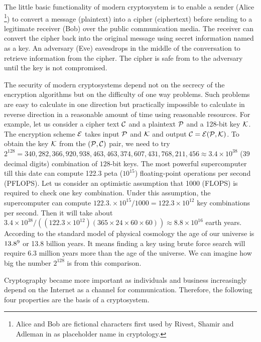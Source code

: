The little basic functionality of modern cryptosystem is to enable a sender (Alice \footnote{Alice and Bob are fictional characters first used by Rivest, Shamir and Adleman in \cite{rivest1978method} as placeholder name in cryptology.}) to convert a message (plaintext) into a cipher (ciphertext) before sending to a legitimate receiver (Bob) over the public communication media. 
The receiver can convert the cipher back into the original message using secret information named as a key.
An adversary (Eve) eavesdrops in the middle of the conversation to retrieve information from the cipher.
The cipher is safe from to the adversary until the key is not compromised. 

The security of modern cryptosystems depend not on the secrecy of the encryption algorithms but on the difficulty of one way problems. 
Such problems are easy to calculate in one direction but practically impossible to calculate in reverse direction in a reasonable amount of time using reasonable resources.
For example, let us consider a cipher text $\cal{C}$ and a plaintext $\cal{P}$ and a 128-bit key $\cal{K}$. 
The encryption scheme $\cal{E}$ takes input $\cal{P}$ and $\cal{K}$ and output $\cal{C}=E( \cal{P}, K)$. 
To obtain the  key $\cal{K}$ from the $(\cal{P,C})$ pair, we need to try $2^{128} = 340,282,366,920,938,463,463,374,607,431,768,211,456 \approx 3.4 \times 10^{38}$ (39 decimal digits) combination of $128$-bit keys.
The most powerful supercomputer till this date  can compute 122.3 peta ($10^{15}$) floating-point operations per second (PFLOPS).
Let us consider an  optimistic assumption that 1000 (FLOPS) is required to check one key combination.
Under this assumption, the supercomputer can compute $122.3. \times 10^{15} / 1000 = 122.3 \times 10^{12}$ key combinations per second.
Then it will take about $3.4 \times 10^{38}/((122.3 \times 10^{12})(365 \times 24 \times 60 \times 60)) \approx  8.8 \times 10^{16}$ earth years.
According to the standard model of physical cosmology \cite{Ade:2015xua} the age of our universe is $13.8 \time 10^9$ or 13.8 billion years. 
It means finding a key using brute force search will require $6.3$ million years more than the age of the universe.
We can imagine how big the number $2^{128}$ is from this comparison.



Cryptography became more important as individuals and business increasingly depend on the Internet as a channel for communication. Therefore, the following four properties are the basis of a cryptosystem.


